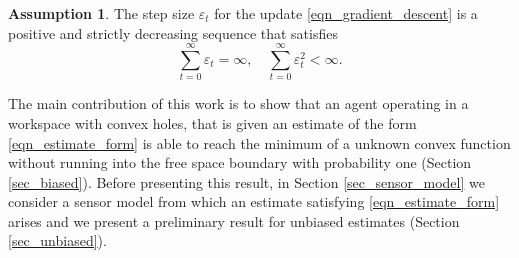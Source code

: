 \documentclass[article]{IEEEtran}
\theoremstyle{definition}
\newtheorem{assumption}{Assumption}
\begin{document}
%
\begin{assumption}\label{assumption_step_size}
The step size $\varepsilon_t$ for the update \eqref{eqn_gradient_descent} is a positive and strictly decreasing sequence that satisfies 
 \begin{equation}
 \sum_{t=0}^\infty \varepsilon_t =\infty, \quad \sum_{t=0}^\infty \varepsilon_t^2 < \infty.
 \end{equation}
\end{assumption}
%
The main contribution of this work is to show that an agent operating in a workspace with convex holes, that is given an estimate of the form \eqref{eqn_estimate_form} is able to reach the minimum of a unknown convex function without running into the free space boundary with probability one (Section \ref{sec_biased}). Before presenting this result, in Section \ref{sec_sensor_model} we consider a sensor model from which an estimate satisfying \eqref{eqn_estimate_form} arises and we present a preliminary result for unbiased estimates (Section \ref{sec_unbiased}).
%
\end{document}
